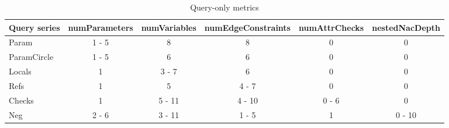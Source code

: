 \begin{table}[Htb]
	\centering
	\scriptsize
	\caption{Query-only metrics}
\begin{tabular}{|l|c|c|c|c|c|}
\hline 
\textbf{Query series} & \textbf{numParameters} & \textbf{numVariables} &
\textbf{numEdgeConstraints} & \textbf{numAttrChecks} &
\textbf{nestedNacDepth}\\ \hline Param & \cellcolor{blue!25}1 - 5 & 8 & 8 & 0 & 0\\ \hline ParamCircle & \cellcolor{blue!25}1 - 5 & 6 & 6 & 0 & 0\\ \hline
Locals & 1 & \cellcolor{blue!25}3 - 7 & 6 & 0 & 0\\ \hline
Refs & 1 & 5 & \cellcolor{blue!25}4 - 7 & 0 & 0\\ \hline
Checks & 1 & 5 - 11 & 4 - 10 & \cellcolor{blue!25}0 - 6 & 0\\ \hline
Neg & 2 - 6 & 3 - 11 & 1 - 5 & 1 & \cellcolor{blue!25}0 - 10\\ \hline
\end{tabular}

	\label{tab:queryonlymetrics}
\end{table}
